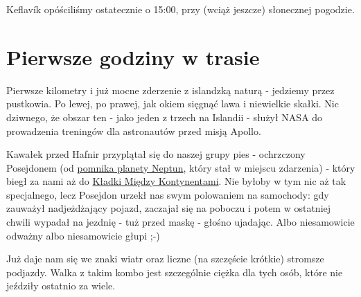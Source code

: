 Keflavík opóściliśmy ostatecznie o 15:00, przy (wciąż jeszcze) słonecznej pogodzie.


\section*{Pierwsze godziny w trasie}

Pierwsze kilometry i już mocne zderzenie z islandzką naturą - jedziemy przez pustkowia. Po lewej, po prawej, jak okiem sięgnąć lawa i niewielkie skałki. Nic dziwnego, że obszar ten - jako jeden z trzech na Islandii - służył NASA do prowadzenia treningów dla astronautów przed misją Apollo.



Kawałek przed Hafnir przyplątał się do naszej grupy pies - ochrzczony Posejdonem (od \href{https://www.facebook.com/120832791270880/photos/a.612815058739315.1073741825.120832791270880/612815132072641/?type=3&theater}{pomnika planety Neptun}, który stał w miejscu zdarzenia) - który biegł za nami aż do \href{http://www.visitreykjanes.is/searchresults/attraction/bridge-between-continents}{Kładki Między Kontynentami}. Nie byłoby w tym nic aż tak specjalnego, lecz Posejdon urzekł nas swym polowaniem na samochody: gdy zauważył nadjeżdżający pojazd, zaczajał się na poboczu i potem w ostatniej chwili wypadał na jezdnię - tuż przed maskę - głośno ujadając. Albo niesamowicie odważny albo niesamowicie głupi ;-)

Już daje nam się we znaki wiatr oraz liczne (na szczęście krótkie) stromsze podjazdy. Walka z takim kombo jest szczególnie ciężka dla tych osób, które nie jeździły ostatnio za wiele.


